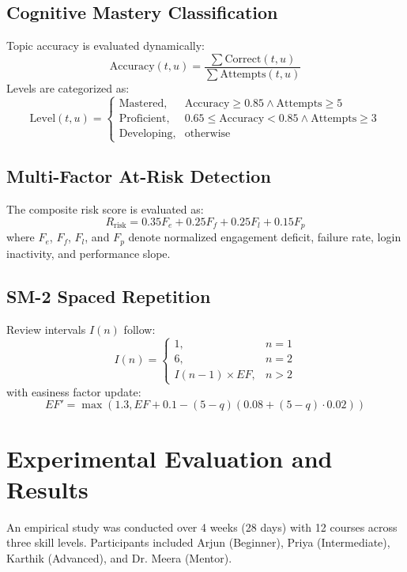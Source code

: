 \documentclass[conference]{IEEEtran}
\begin{document}
\subsection{Cognitive Mastery Classification}
Topic accuracy is evaluated dynamically:
\begin{equation}
\text{Accuracy}(t, u) = \frac{\sum \text{Correct}(t, u)}{\sum \text{Attempts}(t, u)}
\end{equation}
Levels are categorized as:
\begin{equation}
\text{Level}(t, u) = 
\begin{cases} 
\text{Mastered}, & \text{Accuracy} \ge 0.85 \land \text{Attempts} \ge 5 \\
\text{Proficient}, & 0.65 \le \text{Accuracy} < 0.85 \land \text{Attempts} \ge 3 \\
\text{Developing}, & \text{otherwise}
\end{cases}
\end{equation}

\subsection{Multi-Factor At-Risk Detection}
The composite risk score is evaluated as:
\begin{equation}
R_{\text{risk}} = 0.35 F_e + 0.25 F_f + 0.25 F_l + 0.15 F_p
\end{equation}
where $F_e$, $F_f$, $F_l$, and $F_p$ denote normalized engagement deficit, failure rate, login inactivity, and performance slope.

\subsection{SM-2 Spaced Repetition}
Review intervals $I(n)$ follow:
\begin{equation}
I(n) = \begin{cases}
1, & n = 1 \\
6, & n = 2 \\
I(n-1) \times EF, & n > 2
\end{cases}
\end{equation}
with easiness factor update:
\begin{equation}
EF' = \max\left(1.3, EF + 0.1 - (5 - q)(0.08 + (5 - q) \cdot 0.02)\right)
\end{equation}

\section{Experimental Evaluation and Results}
An empirical study was conducted over 4 weeks (28 days) with 12 courses across three skill levels. Participants included Arjun (Beginner), Priya (Intermediate), Karthik (Advanced), and Dr. Meera (Mentor).
\end{document}
